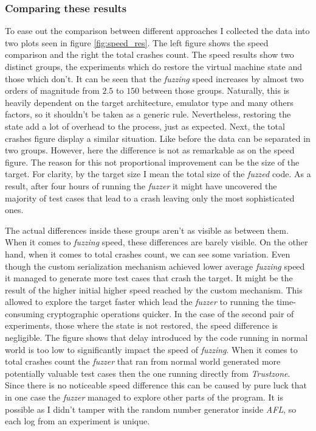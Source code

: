 \subsubsection{Comparing these results}
To ease out the comparison between different approaches I collected the data into two plots seen in figure \ref{fig:speed_res}. The left figure shows the speed comparison and the right the total crashes count. The speed results show two distinct groups, the experiments which do restore the virtual machine state and those which don't. It can be seen that the \textit{fuzzing} speed increases by almost two orders of magnitude from $2.5$ to $150$ between those groups. Naturally, this is heavily dependent on the target architecture, emulator type and many others factors, so it shouldn't be taken as a generic rule. Nevertheless, restoring the state add a lot of overhead to the process, just as expected. Next, the total crashes figure display a similar situation. Like before the data can be separated in two groups. However, here the difference is not as remarkable as on the speed figure. The reason for this not proportional improvement can be the size of the target. For clarity, by the target size I mean the total size of the \textit{fuzzed} code. As a result, after four hours of running the \textit{fuzzer} it might have uncovered the majority of test cases that lead to a crash leaving only the most sophisticated ones.

The actual differences inside these groups aren't as visible as between them. When it comes to \textit{fuzzing} speed, these differences are barely visible. On the other hand, when it comes to total crashes count, we can see some variation. Even though the custom serialization mechanism achieved lower average \textit{fuzzing} speed it managed to generate more test cases that crash the target. It might be the result of the higher initial higher speed reached by the custom mechanism. This allowed to explore the target faster which lead the \textit{fuzzer} to running the time-consuming cryptographic operations quicker. In the case of the second pair of experiments, those where the state is not restored, the speed difference is negligible. The figure shows that delay introduced by the code running in normal world is too low to significantly impact the speed of \textit{fuzzing}. When it comes to total crashes count the \textit{fuzzer} that ran from normal world generated more potentially valuable test cases then the one running directly from \textit{Trustzone}. Since there is no noticeable speed difference this can be caused by pure luck that in one case the \textit{fuzzer} managed to explore other parts of the program. It is possible as I didn't tamper with the random number generator inside \textit{AFL}, so each log from an experiment is unique.

